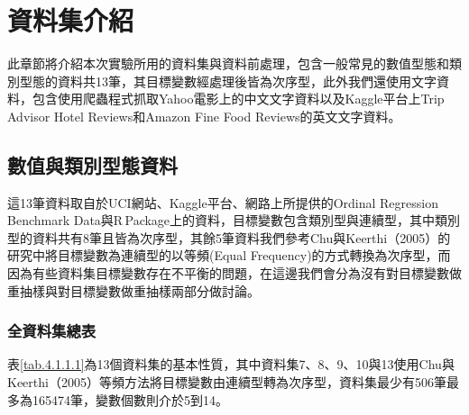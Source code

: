%
\cleardoublepage
\thispagestyle{empty}
\setlength{\parindent}{2em}


\chapter{資料集介紹}

	此章節將介紹本次實驗所用的資料集與資料前處理，包含一般常見的數值型態和類別型態的資料共13筆，其目標變數經處理後皆為次序型，此外我們還使用文字資料，包含使用爬蟲程式抓取Yahoo電影上的中文文字資料以及Kaggle平台上Trip Advisor Hotel Reviews和Amazon Fine Food Reviews的英文文字資料。
	
\section{數值與類別型態資料}

	這13筆資料取自於UCI網站、Kaggle平台、網路上所提供的Ordinal Regression Benchmark Data與R\,Package上的資料，目標變數包含類別型與連續型，其中類別型的資料共有8筆且皆為次序型，其餘5筆資料我們參考Chu與Keerthi（2005）的研究中將目標變數為連續型的以等頻(Equal Frequency)的方式轉換為次序型，而因為有些資料集目標變數存在不平衡的問題，在這邊我們會分為沒有對目標變數做重抽樣與對目標變數做重抽樣兩部分做討論。
	

\subsection{全資料集總表}

	表\ref{tab.4.1.1.1}為13個資料集的基本性質，其中資料集7、8、9、10與13使用Chu與Keerthi（2005）等頻方法將目標變數由連續型轉為次序型，資料集最少有506筆最多為165474筆，變數個數則介於5到14。

